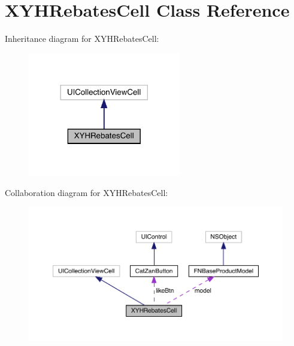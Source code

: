 \hypertarget{interface_x_y_h_rebates_cell}{}\section{X\+Y\+H\+Rebates\+Cell Class Reference}
\label{interface_x_y_h_rebates_cell}


Inheritance diagram for X\+Y\+H\+Rebates\+Cell\+:\nopagebreak
\begin{figure}[H]
\begin{center}
\leavevmode
\includegraphics[width=189pt]{interface_x_y_h_rebates_cell__inherit__graph}
\end{center}
\end{figure}


Collaboration diagram for X\+Y\+H\+Rebates\+Cell\+:\nopagebreak
\begin{figure}[H]
\begin{center}
\leavevmode
\includegraphics[width=350pt]{interface_x_y_h_rebates_cell__coll__graph}
\end{center}
\end{figure}

